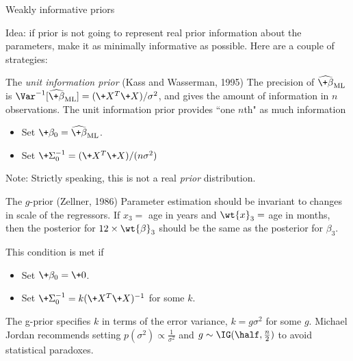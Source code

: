 \documentclass[10pt]{beamer}
\begin{document}
\begin{frame}{Weakly informative priors}

\scriptsize  Idea: if prior is not going to represent real prior information about the parameters, make it as minimally informative as possible.   Here are a couple of strategies:
\pause 
\vfill 
\begin{sblock}{The \textit{unit information prior} \hfill \tiny (Kass and Wasserman, 1995) }	
\scriptsize The precision of $\widehat{\+\beta}_{\text{ML}}$ is  $\Var^{-1} [\widehat{\+\beta}_{\text{ML}}] = (\+X^T\+X)/ \sigma^2$, and gives the amount of information in $n$ observations.  The unit information prior provides ``one $n$th" as much information 

\begin{itemize}
\item Set $\+\beta_0 = \widehat{\+\beta}_{\text{ML}}$.
\item Set $\+\Sigma_0^{-1} = (\+X^T\+X)/ (n\sigma^2)$
\end{itemize}

{\tiny Note: Strictly speaking, this is not a real \textit{prior} distribution.}
\end{sblock}

\pause 
\begin{sblock}{The $g$-prior \hfill \tiny (Zellner, 1986)}
Parameter estimation should be invariant to changes in scale of the regressors.  If $x_3 =$ age in years and $\wt{x}_3=$ age in months, then the posterior for $12 \times \wt{\beta}_3$ should be the same as the posterior for $\beta_3$. 

This condition is met if 
\begin{itemize}
\item Set $\+\beta_0 = \+0$.
\item Set $\+\Sigma_0^{-1} = k (\+X^T\+X)^{-1}$ for some $k$.
\end{itemize}

The g-prior specifies $k$ in terms of the error variance, $k=g \sigma^2$ for some $g$.  Michael Jordan recommends setting $p(\sigma^2) \propto \frac{1}{\sigma^2}$ and $g \sim \IG(\half, \frac{n}{2})$ to avoid statistical paradoxes.
\end{sblock}

\end{frame}
\end{document}

